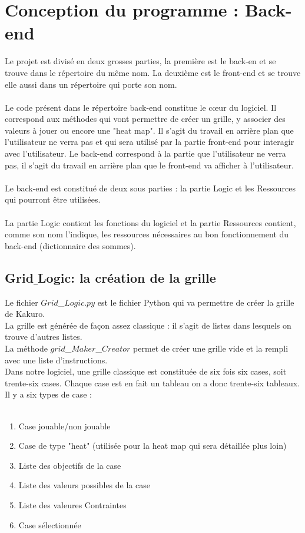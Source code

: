 \documentclass[12pt]{article}
\begin{document}
\section{Conception du programme : Back-end}
Le projet est divisé en deux grosses parties, la première est le back-en et se trouve dans le répertoire du même nom. La deuxième est le front-end et se trouve elle aussi dans un répertoire qui porte son nom.
\\ \\
Le code présent dans le répertoire back-end constitue le cœur du logiciel. Il correspond aux méthodes qui vont permettre de créer un grille, y associer des valeurs à jouer ou  encore une "heat map". Il s'agit du travail en arrière plan que l'utilisateur ne verra pas et qui sera utilisé par la partie front-end pour interagir avec l'utilisateur.
Le back-end correspond à la partie que l'utilisateur ne verra pas, il s'agit du travail en arrière plan que le front-end va afficher à l'utilisateur. \\ \\ 
Le back-end est constitué de deux sous parties : la partie Logic et les Ressources qui pourront être utilisées. \\ \\
La partie Logic contient les fonctions du logiciel et la partie Ressources contient, comme son nom l'indique, les ressources nécessaires au bon fonctionnement du back-end (dictionnaire des sommes).

 

\subsection{Grid$\_$Logic: la création de la grille}
Le fichier $Grid$\_$Logic.py$ est le fichier Python qui va permettre de créer la grille de Kakuro. \\ La grille est générée de façon assez classique : il s'agit de listes dans lesquels on trouve d'autres listes. \\
La méthode $grid$\_$Maker$\_$Creator$ permet de créer une grille vide et la rempli avec une liste d'instructions. \\
Dans notre logiciel, une grille classique est constituée de six fois six cases, soit trente-six cases. Chaque case est en fait un tableau on a donc trente-six tableaux. \\
\newpage
Il y a six types de case : \\ \\
\begin{enumerate}
\item[] Case jouable/non jouable
\item[] Case de type "heat" (utilisée pour la heat map qui sera détaillée plus loin)
\item[] Liste des objectifs de la case
\item[] Liste des valeurs possibles de la case
\item[] Liste des valeures Contraintes
\item[] Case sélectionnée
\end{enumerate} 
\end{document}
